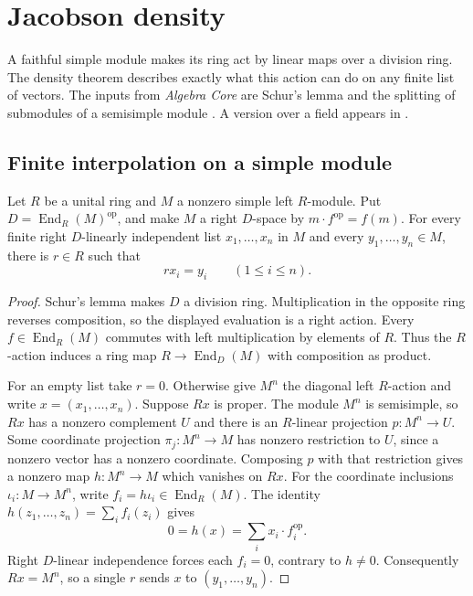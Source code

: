\chapter{Jacobson density}
\label{ch:rm03-density}

A faithful simple module makes its ring act by linear maps over a
division ring. The density theorem describes exactly what this action
can do on any finite list of vectors. The inputs from \emph{Algebra Core}
are Schur's lemma and the splitting of submodules of a semisimple module
\cite[Ch.~3, ALG-03-C03-R03]{p103}. A version over a field appears in
\cite[Thm.~3.3]{mitdensity}.

\section{Finite interpolation on a simple module}

\begin{theorem}
\label{thm:rm03-density}
Let \(R\) be a unital ring and \(M\) a nonzero simple left \(R\)-module.
Put \(D=\operatorname{End}_R(M)^{\mathrm{op}}\), and make \(M\) a right
\(D\)-space by \(m\cdot f^{\mathrm{op}}=f(m)\). For every finite
right \(D\)-linearly independent list \(x_1,\ldots,x_n\) in \(M\) and
every \(y_1,\ldots,y_n\in M\), there is \(r\in R\) such that
\[
   rx_i=y_i\qquad (1\leq i\leq n).
\]
\end{theorem}
\begin{proof}
Schur's lemma makes \(D\) a division ring. Multiplication in the
opposite ring reverses composition, so the displayed evaluation is a
right action. Every \(f\in\operatorname{End}_R(M)\) commutes with left
multiplication by elements of \(R\). Thus the \(R\)-action induces a
ring map \(R\to\operatorname{End}_D(M)\) with composition as product.

For an empty list take \(r=0\). Otherwise give \(M^n\) the diagonal
left \(R\)-action and write \(x=(x_1,\ldots,x_n)\). Suppose \(Rx\) is
proper. The module \(M^n\) is semisimple, so \(Rx\) has a nonzero
complement \(U\) and there is an \(R\)-linear projection \(p:M^n\to U\).
Some coordinate projection \(\pi_j:M^n\to M\) has nonzero restriction
to \(U\), since a nonzero vector has a nonzero coordinate. Composing
\(p\) with that restriction gives a nonzero map \(h:M^n\to M\) which
vanishes on \(Rx\). For the coordinate inclusions \(\iota_i:M\to M^n\),
write \(f_i=h\iota_i\in\operatorname{End}_R(M)\). The identity
\(h(z_1,\ldots,z_n)=\sum_i f_i(z_i)\) gives
\[
      0=h(x)=\sum_i x_i\cdot f_i^{\mathrm{op}}.
\]
Right \(D\)-linear independence forces each \(f_i=0\), contrary to
\(h\ne 0\). Consequently \(Rx=M^n\), so a single \(r\) sends \(x\)
to \((y_1,\ldots,y_n)\).
\end{proof}

